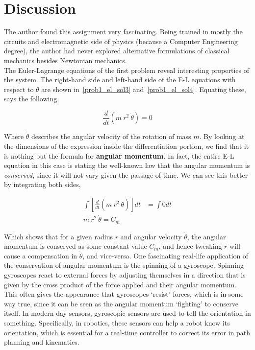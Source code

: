 \documentclass[conference]{IEEEtran}
\begin{document}
\section{Discussion}

The author found this assignment very fascinating. Being trained in mostly the circuits and electromagnetic side
of physics (because a Computer Engineering degree), the author had never explored alternative formulations of classical mechanics besides
Newtonian mechanics.\\

The Euler-Lagrange equations of the first problem reveal interesting properties of the system.
The right-hand side and left-hand side of the E-L equations with respect to $\theta$ are
shown in~\ref{prob1_el_sol3} and~\ref{prob1_el_sol4}. Equating these, says the following,

\[
    \frac{d}{dt}\left( m~r^2~\dot{\theta} \right) = 0
\]

Where $\dot{\theta}$ describes the angular velocity of the rotation of mass $m$. By looking at the
dimensions of the expression inside the differentiation portion, we find that it is nothing
but the formula for \textbf{angular momentum}. In fact, the entire E-L equation in this case
is stating the well-known law that the angular momentum is \textit{conserved}, since it will not vary given
the passage of time. We can see this better by integrating both sides,

\begin{align*}
    \int \left[\frac{d}{dt}\left( m~r^2~\dot{\theta} \right)\right] dt &= \int 0 dt\\
    m~r^2~\dot{\theta} = C_{m}
\end{align*}

Which shows that for a given radius $r$ and angular velocity $\dot{\theta}$, the angular momentum
is conserved as some constant value $C_m$, and hence tweaking $r$ will cause a compensation in $\dot{\theta}$, and vice-versa.
One fascinating real-life application of the conservation of angular momentum is the spinning of a gyroscope.
Spinning gyroscopes react to external forces by adjusting themselves in a direction that is given by the cross product
of the force applied and their angular momentum. This often gives the appearance that gyroscopes `resist' forces,
which is in some way true, since it can be seen as the angular momentum `fighting' to conserve itself. In modern
day sensors, gyroscopic sensors are used to tell the orientation in something. Specifically, 
in robotics, these sensors can help a robot know its orientation, which is essential for a real-time
controller to correct its error in path planning and kinematics.\\
\end{document}
